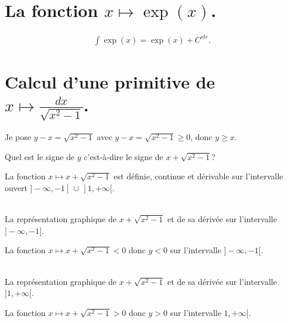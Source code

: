 \documentclass[a4paper,landscape,17pt]{extreport} %
\begin{document}
\section{La fonction  $x \mapsto \exp(x) $.}

\begin{align*}
\int \exp(x) = \exp(x) + C^{ste}.
\end{align*}

\section{Calcul d'une primitive de $ x \longmapsto  \frac{dx}{\sqrt{x^2 - 1} } $. }


Je pose $y-x = \sqrt{x^2 - 1} $ avec $y - x = \sqrt{x^2 - 1} \geqslant 0 $, donc $y \geqslant  x$.

Quel est le signe de $y$ c'est-à-dire le signe de $x + \sqrt{x^2 - 1} $?

La fonction $ x\mapsto x + \sqrt{x^2 - 1} $ est définie, continue et dérivable sur l'intervalle ouvert $ ]-\infty,-1[ \, \cup \, ]1,+\infty[ $.

\begin{center}
 \\
La représentation graphique de $x + \sqrt{x^2-1}$ et de sa dérivée sur l'intervalle $ ]-\infty,-1[ $.
\end{center}
La fonction $ x\mapsto x + \sqrt{x^2 - 1} < 0 $ donc $ y < 0 $ sur l'intervalle $ ]-\infty,-1[ $.

\begin{center}
 \\
La représentation graphique de $x + \sqrt{x^2-1}$ et de sa dérivée sur l'intervalle $ ]1,+\infty[ $.
\end{center}

La fonction $ x\mapsto x + \sqrt{x^2 - 1} > 0 $ donc $ y > 0 $ sur l'intervalle $ 1,+\infty[ $.
\end{document}
